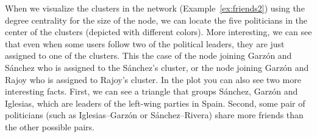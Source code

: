 
When we visualize the clusters in the network (Example~\ref{ex:friends2}) using the degree centrality for the size of the node, we can locate the five politicians in the center of the clusters (depicted with different colors). More interesting, we can see that even when some users follow two of the political leaders, they are just assigned to one of the clusters. This the case of the node joining Garz\'on and S\'anchez who is assigned to the S\'anchez's cluster, or the node joining Garz\'on and Rajoy who is assigned to Rajoy's cluster. In the plot you can also see two more interesting facts. First, we can see a triangle that groups S\'anchez, Garz\'on and Iglesias, which are leaders of the left-wing parties in Spain. Second, some pair of politicians (such as Iglesias--Garz\'on or S\'anchez--Rivera) share more friends than the other possible pairs.

